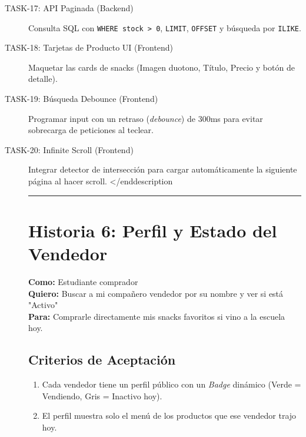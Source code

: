 \documentclass[11pt, letterpaper]{article}
\begin{document}
    \begin{description}
        \item[TASK-17: API Paginada (Backend)] Consulta SQL con \texttt{WHERE stock > 0}, \texttt{LIMIT}, \texttt{OFFSET} y búsqueda por \texttt{ILIKE}.
        \item[TASK-18: Tarjetas de Producto UI (Frontend)] Maquetar las cards de snacks (Imagen duotono, Título, Precio y botón de detalle).
        \item[TASK-19: Búsqueda Debounce (Frontend)] Programar input con un retraso (\textit{debounce}) de 300ms para evitar sobrecarga de peticiones al teclear.
        \item[TASK-20: Infinite Scroll (Frontend)] Integrar detector de intersección para cargar automáticamente la siguiente página al hacer scroll.
    </end{description}

    \vspace{1em}
    \hrule
    \vspace{2em}

    \section{Historia 6: Perfil y Estado del Vendedor}
   
    \begin{tcolorbox}[colback=red!5!white,colframe=red!75!black,title=HU-06: Rastreo de Vendedores Favoritos]
        \textbf{Como:} Estudiante comprador \\
        \textbf{Quiero:} Buscar a mi compañero vendedor por su nombre y ver si está "Activo" \\
        \textbf{Para:} Comprarle directamente mis snacks favoritos si vino a la escuela hoy.
    \end{tcolorbox}
   
    \subsection{Criterios de Aceptación}
    \begin{enumerate}[label=\bfseries\arabic*.]
        \item Cada vendedor tiene un perfil público con un \textit{Badge} dinámico (Verde = Vendiendo, Gris = Inactivo hoy).
        \item El perfil muestra solo el menú de los productos que ese vendedor trajo hoy.
    \end{enumerate}
   

\end{description}
\end{document}
